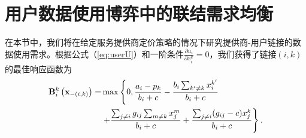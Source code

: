 \section{用户数据使用博弈中的联结需求均衡}\label{sec:stageII}

在本节中，我们将在给定服务提供商定价策略的情况下研究提供商-用户链接的数据使用需求。根据公式（\ref{eq:userU}）和一阶条件$\frac{\partial u_{i}}{\partial x^{k}_{i}} = 0$，我们获得了链接$(i,k)$的最佳响应函数为
\begin{align}\label{br1}
\bold{B}^{k}_{i}\left(\mathbf{x}_{-(i,k)}\right)=&\max\left\{0,\frac{a_i-p_k}{b_i+c}-\frac{b_i\sum_{k'\neq k}x^{k'}_i}{b_i+c}\right.\nonumber\\
&\left.+\frac{\sum_{j\neq i}g_{ij}\sum_{m\neq k}x_{j}^{m}}{b_i+c}+\frac{\sum_{j\neq i}(g_{ij}-c)x_{j}^{k}}{b_i+c}\right\}.
\end{align}

